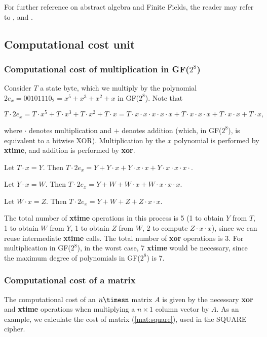 \documentclass{report}
\begin{document}
For further reference on abstract algebra and Finite Fields, the reader may refer to \cite{panario2007topicos}, \cite{panario2013handbook} and \cite{Handbook1996}.

\subsection{Computational cost unit}\label{sec:comp-cost}

\subsubsection{Computational cost of multiplication in GF($2^8$)}
Consider $T$ a state byte, which we multiply by the polynomial $2e_x = 00101110_2 = x^5 + x^3 + x^2 + x$ in GF($2^8$). Note that 

$$
T \cdot 2e_x = T \cdot x^5 + T \cdot x^3 + T \cdot x^2 + T \cdot x = T \cdot x \cdot x \cdot x \cdot x \cdot x + T \cdot x \cdot x \cdot x + T \cdot x \cdot x + T \cdot x,
$$

where $\cdot$ denotes multiplication and $+$ denotes addition (which, in GF($2^8$), is equivalent to a bitwise XOR). Multiplication by the $x$ polynomial is performed by \textbf{xtime}, and addition is performed by \textbf{xor}.

Let $T \cdot x = Y$. Then $T \cdot 2e_x = Y + Y \cdot x + Y \cdot x \cdot x + Y \cdot x \cdot x \cdot x \cdot $.

Let $Y \cdot x = W$. Then $T \cdot 2e_x = Y + W + W \cdot x + W \cdot x \cdot x \cdot x$.

Let $W \cdot x = Z$. Then $T \cdot 2e_x = Y + W + Z + Z \cdot x \cdot x$.

The total number of \textbf{xtime} operations in this process is 5 (1 to obtain $Y$ from $T$, 1 to obtain $W$ from $Y$, 1 to obtain $Z$ from $W$, 2 to compute $Z \cdot x \cdot x$), since we can reuse intermediate \textbf{xtime} calls. The total number of \textbf{xor} operations is 3. For multiplication in GF($2^8$), in the worst case, 7 \textbf{xtime} would be necessary, since the maximum degree of polynomials in GF($2^8$) is 7.

\subsubsection{Computational cost of a matrix}
The computational cost of an $n\timesn$ matrix $A$ is given by the necessary \textbf{xor} and \textbf{xtime} operations when multiplying a $n\times1$ column vector by $A$. As an example, we calculate the cost of matrix (\ref{mat:square}), used in the SQUARE \cite{SQUARE1997} cipher. 
\end{document}
